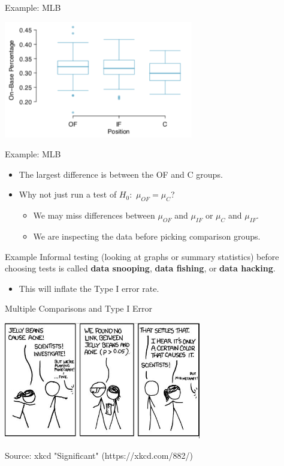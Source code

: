 \begin{frame}{Example: MLB}
    \begin{center}
        \includegraphics[height=2in]{images/mlb.png}
    \end{center}
\end{frame}

\begin{frame}{Example: MLB}
    \begin{itemize}
        \item The largest difference is between the OF and C groups.
        \item Why not just run a test of $H_0:$ $\mu_{OF} = \mu_C$?
        \begin{itemize}
            \item We may miss differences between $\mu_{OF}$ and $\mu_{IF}$ or $\mu_{C}$ and $\mu_{IF}$.
            \item We are inspecting the data before picking comparison groups.
        \end{itemize}
    \end{itemize}
\end{frame}

\begin{frame}{Example}
    Informal testing (looking at graphs or summary statistics) before choosing tests is called \textbf{data snooping}, \textbf{data fishing}, or \textbf{data hacking}.
    \begin{itemize}
        \item This will inflate the Type I error rate.
    \end{itemize}
\end{frame}

\begin{frame}{Multiple Comparisons and Type I Error}
\begin{center}
    \includegraphics[height=2in]{images/xkcd1.JPG}
\end{center}
\hfill\flushright\tiny
Source: xkcd "Significant" (https://xkcd.com/882/)
\end{frame}

